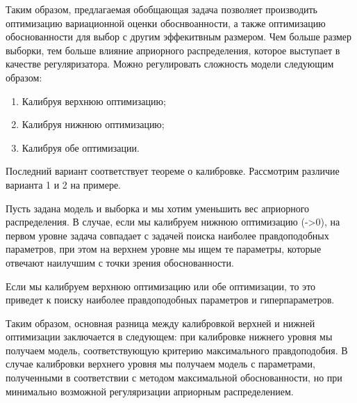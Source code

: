 Таким образом, предлагаемая обобщающая задача позволяет производить оптимизацию вариационной оценки обоснвоанности, а также оптимизацию обоснованности для выбор с другим эффекитвным размером. Чем больше размер выборки, тем больше влияние априорного распределения, которое выступает в качестве регуляризатора. Можно регулировать сложность модели следующим образом:
\begin{enumerate}
\item Калибруя верхнюю оптимизацию;
\item Калибруя нижнюю оптимизацию;
\item Калибруя обе оптимизации.
\end{enumerate}
Последний вариант соответствует теореме о калибровке. 
Рассмотрим различие варианта 1 и 2 на примере.
\begin{example}
Пусть задана модель и выборка и мы хотим уменьшить вес априорного распределения.
В случае, если мы калибруем нижнюю оптимизацию (->0), на первом уровне задача совпадает с задачей поиска наиболее правдоподобных параметров, при этом на верхнем уровне мы ищем те параметры, которые отвечают наилучшим с точки зрения обоснованности.

Если мы калибруем верхнюю оптимизацию или обе оптимизации, то это приведет к поиску наиболее правдоподобных параметров и гиперпараметров. 

Таким образом, основная разница между калибровкой верхней и нижней оптимизации заключается в следующем:
при калибровке нижнего уровня мы получаем модель, соответствующую критерию максимального правдоподобия.
В случае калибровки верхнего уровня мы получаем модель с параметрами, полученными в соответствии с методом максимальной обоснованности, но при минимально возможной регуляризации априорным распределением.
\end{example}



